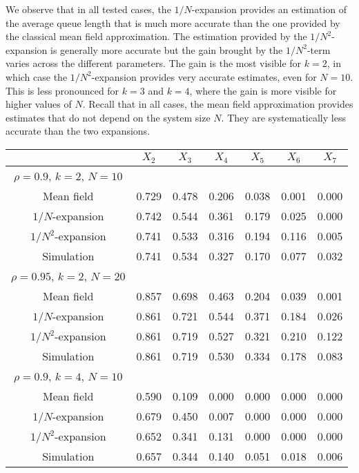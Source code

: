 \documentclass[sigconf]{acmart}
\begin{document}
We observe that in all tested cases, the $1/N$-expansion provides an
estimation of the average queue length that is much more accurate than the one
provided by the classical mean field approximation. The estimation
provided by the $1/N^2$-expansion is generally more accurate but the
gain brought by the $1/N^2$-term varies across the different
parameters. The gain is the most visible for $k=2$, in which case the
$1/N^2$-expansion provides very accurate estimates, even for
$N=10$. This is less pronounced for $k=3$ and $k=4$, where the
gain is more visible for higher values of $N$. Recall that in all
cases, the mean field approximation provides estimates that do not
depend on the system size $N$. They are systematically less accurate
than the two expansions.



\begin{table}[t]
  \centering
  \begin{tabular}{@{}|@{}c@{}|c|c|c|c|c|c|}
    \hline
    & $X_2$ &$X_3$ &  $X_4$ &  $X_5$&   $X_6$ &  $X_7$  \\\hline
    $\rho{=}0.9$, $k{=}2$, $N{=}10$ &&&&&&\\
    Mean field		& 0.729 & 0.478 & 0.206 & 0.038 & 0.001 & 0.000 \\
    $1/N$-expansion	& 0.742 & 0.544 & 0.361 & 0.179 & 0.025 & 0.000 \\
    $1/N^2$-expansion	& 0.741 & 0.533 & 0.316 & 0.194 & 0.116 & 0.005 \\
    Simulation		& 0.741 & 0.534 & 0.327 & 0.170 & 0.077 & 0.032 \\
    \hline
    
    $\rho{=}0.95$, $k{=}2$, $N{=}20$ &&&&&&\\
    Mean field		& 0.857 & 0.698 & 0.463 & 0.204 & 0.039 & 0.001 \\
    $1/N$-expansion	& 0.861 & 0.721 & 0.544 & 0.371 & 0.184 & 0.026 \\
    $1/N^2$-expansion	& 0.861 & 0.719 & 0.527 & 0.321 & 0.210 & 0.122 \\
    Simulation		& 0.861 & 0.719 & 0.530 & 0.334 & 0.178 & 0.083 \\
    \hline
    
    $\rho{=}0.9$, $k{=}4$, $N{=}10$ &&&&&&\\
    Mean field		& 0.590 & 0.109 & 0.000 & 0.000 & 0.000 & 0.000 \\
    $1/N$-expansion	& 0.679 & 0.450 & 0.007 & 0.000 & 0.000 & 0.000 \\
    $1/N^2$-expansion	& 0.652 & 0.341 & 0.131 & 0.000 & 0.000 & 0.000 \\
    Simulation		& 0.657 & 0.344 & 0.140 & 0.051 & 0.018 & 0.006 \\
    \hline
    

\end{tabular}
\end{table}
\end{document}
